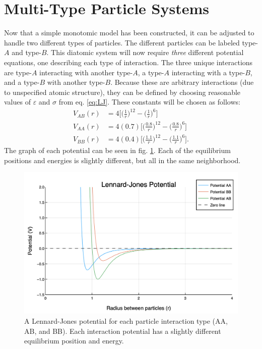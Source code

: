 \section{Multi-Type Particle Systems}\label{Sect:diatomic}
\par Now that a simple monotomic model has been constructed, it can be adjusted to handle two different types of particles. The different particles can be labeled type-$A$ and type-$B$. This diatomic system will now require \textit{three} different potential equations, one describing each type of interaction. The three unique interactions are type-$A$ interacting with another type-$A$, a type-$A$ interacting with a type-$B$, and a type-$B$ with another type-$B$. Because these are arbitrary interactions (due to unspecified atomic structure), they can be defined by choosing reasonable values of $\varepsilon$ and $\sigma$ from eq. \ref{eq:LJ}. These constants will be chosen as follows:
\begin{align}
V_{AB}(r) &= 4 \bigg[\Big(\frac{1}{r}\Big)^{12} - \Big(\frac{1}{r}\Big)^6\bigg] \label{LJ} \\
V_{AA}(r) &= 4 (0.7) \bigg[\Big(\frac{0.8}{r}\Big)^{12} - \Big(\frac{0.8}{r}\Big)^6\bigg] \label{LJ} \\
V_{BB}(r) &= 4 (0.4) \bigg[\Big(\frac{1.1}{r}\Big)^{12} - \Big(\frac{1.1}{r}\Big)^6\bigg] \label{LJ}.
\end{align}
The graph of each potential can be seen in fig. \ref{fig:3LJ}. Each of the equilibrium positions and energies is slightly different, but all in the same neighborhood.

\begin{figure}%
\centering
\includegraphics[scale = 0.5]{Figures/newLJPotential}
\caption{A Lennard-Jones potential for each particle interaction type (AA, AB, and BB). Each interaction potential has a slightly different equilibrium position and energy. 
\label{fig:3LJ}} 
\end{figure}

